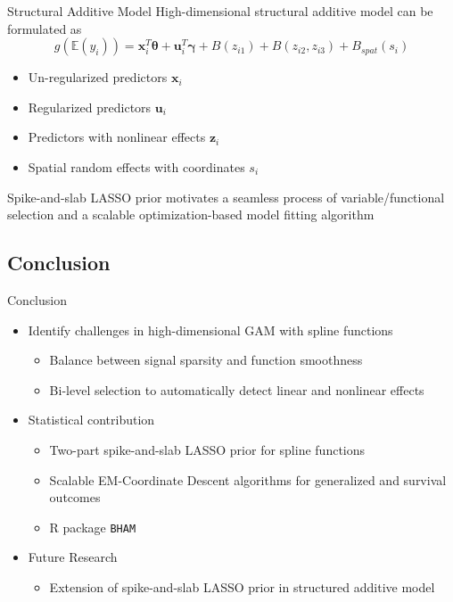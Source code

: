 \documentclass[
  ignorenonframetext,
  aspectratio=169]{beamer}
\providecommand{\tightlist}{%
  \setlength{\itemsep}{0pt}\setlength{\parskip}{0pt}}
\newcommand{\bs}[1]{\boldsymbol{#1}}
\begin{document}
\begin{frame}{Structural Additive Model}
\protect\hypertarget{structural-additive-model}{}
High-dimensional structural additive model can be formulated as \[
g(\mathbb{E}(y_i)) = \bs x_i^T \bs \theta + \bs u_i^T \bs \gamma + B(z_{i1}) + B(z_{i2}, z_{i3}) + B_{spat}(s_i)
\]

\begin{itemize}
\tightlist
\item
  Un-regularized predictors \(\bs x_i\)
\item
  Regularized predictors \(\bs u_i\)
\item
  Predictors with nonlinear effects \(\bs z_i\)
\item
  Spatial random effects with coordinates \(s_i\)
\end{itemize}

Spike-and-slab LASSO prior motivates a seamless process of
variable/functional selection and a scalable optimization-based model
fitting algorithm
\end{frame}

\hypertarget{conclusion-1}{%
\subsection{Conclusion}\label{conclusion-1}}

\begin{frame}[fragile]{Conclusion}
\begin{itemize}
\tightlist
\item
  Identify challenges in high-dimensional GAM with spline functions

  \begin{itemize}
  \tightlist
  \item
    Balance between signal sparsity and function smoothness
  \item
    Bi-level selection to automatically detect linear and nonlinear
    effects
  \end{itemize}
\item
  Statistical contribution

  \begin{itemize}
  \tightlist
  \item
    Two-part spike-and-slab LASSO prior for spline functions
  \item
    Scalable EM-Coordinate Descent algorithms for generalized and
    survival outcomes
  \item
    R package \texttt{BHAM}
  \end{itemize}
\item
  Future Research

  \begin{itemize}
  \tightlist
  \item
    Extension of spike-and-slab LASSO prior in structured additive model
  \end{itemize}
\end{itemize}
\end{frame}
\end{document}
